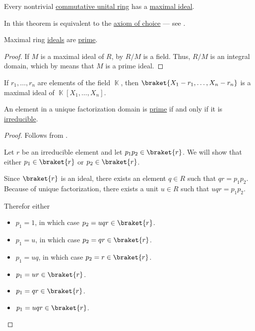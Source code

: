 \begin{theorem}\label{thm:krulls_theorem}
  Every nontrivial \hyperref[def:semiring/commutative_unital_ring]{commutative unital ring} has a \hyperref[def:maximal_ring_ideal]{maximal ideal}.

  In \hyperref[def:zfc]{} this theorem is equivalent to the \hyperref[def:zfc/choice]{axiom of choice} --- see .
\end{theorem}

\begin{proposition}\label{thm:maximal_ideals_are_prime}
  Maximal ring \hyperref[def:maximal_ring_ideal]{ideals} are \hyperref[def:prime_ring_ideal]{prime}.
\end{proposition}
\begin{proof}
  If \( M \) is a maximal ideal of \( R \), by  \( R / M \) is a field. Thus, \( R / M \) is an integral domain, which by  means that \( M \) is a prime ideal.
\end{proof}

\begin{proposition}\label{thm:field_maximal_ideal_representation}
  If \( r_1, \ldots, r_n \) are elements of the field \( \BbbK \), then \( \braket{X_1 - r_1, \ldots, X_n - r_n} \) is a maximal ideal of \( \BbbK[X_1, \ldots, X_n] \).
\end{proposition}

\begin{proposition}\label{thm:ufd_prime_iff_irreducible}
  An element in a unique factorization domain is \hyperref[def:prime_ring_ideal]{prime} if and only if it is \hyperref[def:irreducible_ring_element]{irreducible}.
\end{proposition}
\begin{proof}
  \SufficiencySubProof Follows from .

  \NecessitySubProof Let \( r \) be an irreducible element and let \( p_1 p_2 \in \braket{r} \). We will show that either  \( p_1 \in \braket{r} \) or \( p_2 \in \braket{r} \).

  Since \( \braket{r} \) is an ideal, there exists an element \( q \in R \) such that \( qr = p_1 p_2 \). Because of unique factorization, there exists a unit \( u \in R \) such that \( uqr = p_1 p_2  \).

  Therefor either
  \begin{itemize}
    \item \( p_1 = 1 \), in which case \( p_2 = uqr \in \braket{r} \).
    \item \( p_1 = u \), in which case \( p_2 = qr \in \braket{r} \).
    \item \( p_1 = uq \), in which case \( p_2 = r \in \braket{r} \).
    \item \( p_1 = ur \in \braket{r} \).
    \item \( p_1 = qr \in \braket{r} \).
    \item \( p_1 = uqr \in \braket{r} \).
  \end{itemize}
\end{proof}

